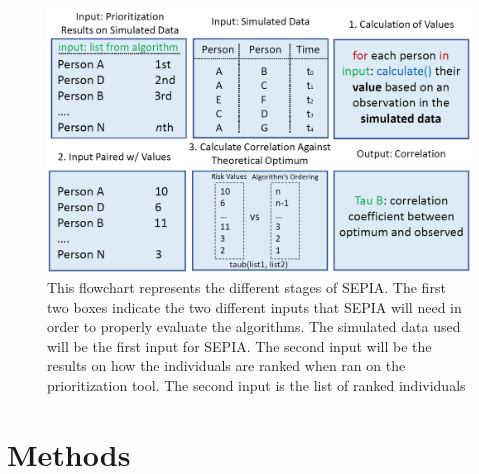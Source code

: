 \documentclass[twocolumn]{bmcart}%
\begin{document}
\begin{multicols}
\begin{figure}
\centering
\includegraphics[scale=0.28]{Figures/SEPIA workflow.png}
\caption{This flowchart represents the different stages of SEPIA. The first two boxes indicate the two different inputs that SEPIA will need in order to properly evaluate the algorithms. The simulated data used will be the first input for SEPIA. The second input will be the results on how the individuals are ranked when ran on the prioritization tool. The second input is the list of ranked individuals}
\end{figure}


\section*{Methods}


\end{multicols}
\end{document}

